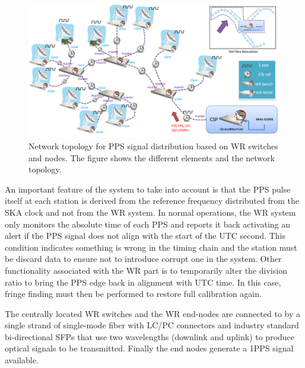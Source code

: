 \begin{figure}[H]
	\centering
	\includegraphics[scale=0.4]{img/ska_pps_network}
	\caption{Network topology for PPS signal distribution based on WR switches and nodes. The figure shows the different elements and the network topology. }
	\label{fig:ska_pps_dist_network}
\end{figure}

 
An important feature of the system to take into account is that the PPS pulse itself at each station is derived from the reference frequency distributed from the SKA clock and not from the WR system. In normal operations, the WR system only monitors the absolute time of each PPS and reports it back activating an alert if the PPS signal does not align with the start of the UTC second. This condition indicates something is wrong in the timing chain and the station must be discard data to ensure not to introduce corrupt one in the system. Other functionality associated with the WR part is to temporarily alter the division ratio to bring the PPS edge back in alignment with UTC time. In this case, fringe finding must then be performed to restore full calibration again.

The centrally located WR switches and the WR end-nodes are connected to by a 
single strand of single-mode fiber with LC/PC connectors and industry standard 
bi-directional SFPs that use two wavelengths (downlink and uplink) to produce 
optical signals to be transmitted. Finally the end nodes generate a 1PPS signal available. 

